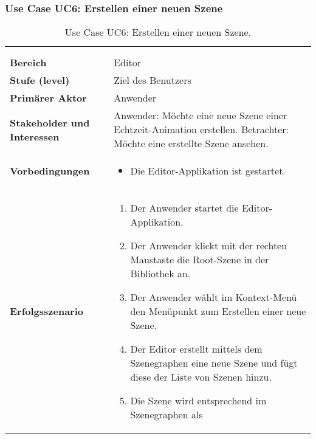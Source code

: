 
\subsubsection{Use Case UC6: Erstellen einer neuen Szene}
\label{ssubsec:requirements:use-cases:uc6}

\begin{longtabu}{p{0.5\textwidth}p{0.5\textwidth}}
    \centering\\
    \caption{Use Case UC6: Erstellen einer neuen
        Szene.}\label{table:uc6-create-new-scene}\\
    \toprule
        \textbf{Bereich} &
        Editor \\
    \cmidrule(r){1-1}\cmidrule(lr){2-2}
        \textbf{Stufe (level)} &
        Ziel des Benutzers \\
    \cmidrule(r){1-1}\cmidrule(lr){2-2}
        \textbf{Primärer Aktor} &
        Anwender \\
    \cmidrule(r){1-1}\cmidrule(lr){2-2}
        \textbf{Stakeholder und Interessen} &
        Anwender: Möchte eine neue Szene einer Echtzeit-Animation erstellen.\newline
        Betrachter: Möchte eine erstellte Szene ansehen.\\
    \cmidrule(r){1-1}\cmidrule(lr){2-2}
        \textbf{Vorbedingungen} &
        \begin{itemize}
            \item{Die Editor-Applikation ist gestartet.}
        \end{itemize} \\
    \cmidrule(r){1-1}\cmidrule(lr){2-2}
        \textbf{Erfolgsszenario} &
        \begin{enumerate}
            \item{Der Anwender startet die Editor-Applikation.}
            \item{Der Anwender klickt mit der rechten Maustaste die Root-Szene in der
                    Bibliothek an.}
            \item{Der Anwender wählt im Kontext-Menü den Menüpunkt zum Erstellen einer neue Szene.}
            \item{Der Editor erstellt mittels dem Szenegraphen eine neue
                    Szene und fügt diese der Liste von Szenen hinzu.}
            \item{Die Szene wird entsprechend im Szenegraphen als
}
\end{enumerate}
\end{longtabu}
